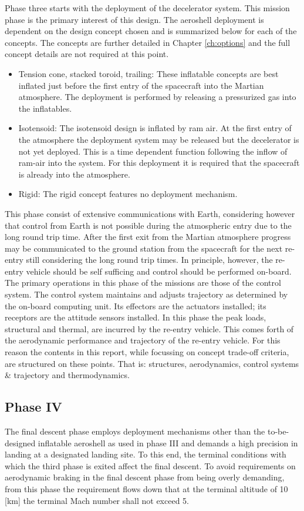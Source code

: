Phase three starts with the deployment of the decelerator system. This mission phase is the primary interest of this design. The aeroshell deployment is dependent on the design concept chosen and is summarized below for each of the concepts. The concepts are further detailed in Chapter \ref{ch:options} and the full concept details are not required at this point.

\begin{itemize}
\item Tension cone, stacked toroid, trailing: These inflatable concepts are best inflated just before the first entry of the spacecraft into the Martian atmosphere. The deployment is performed by releasing a pressurized gas into the inflatables.
\item Isotensoid: The isotensoid design is inflated by ram air. At the first entry of the atmosphere the deployment system may be released but the decelerator is not yet deployed. This is a time dependent function following the inflow of ram-air into the system. For this deployment it is required that the spacecraft is already into the atmosphere.
\item Rigid: The rigid concept features no deployment mechanism.
\end{itemize}
This phase consist of extensive communications with Earth, considering however that control from Earth is not possible during the atmospheric entry due to the long round trip time. After the first exit from the Martian atmosphere progress may be communicated to the ground station from the spacecraft for the next re-entry still considering the long round trip times. In principle, however, the re-entry vehicle should be self sufficing and control should be performed on-board. The primary operations in this phase of the missions are those of the control system. The control system maintains and adjusts trajectory as determined by the on-board computing unit. Its effectors are the actuators installed; its receptors are the attitude sensors installed. In this phase the peak loads, structural and thermal, are incurred by the re-entry vehicle.
This comes forth of the aerodynamic performance and trajectory of the re-entry vehicle. For this reason the contents in this report, while focussing on concept trade-off criteria, are structured on these points. That is: structures, aerodynamics, control systems \& trajectory and thermodynamics.



\subsection{Phase IV}\label{sec:p4}
The final descent phase employs deployment mechanisms other than the to-be-designed inflatable aeroshell as used in phase III and demands a high precision in landing at a designated landing site. To this end, the terminal conditions with which the third phase is exited affect the final descent. To avoid requirements on aerodynamic braking in the final descent phase from being overly demanding, from this phase the requirement flows down that at the terminal altitude of 10 [km] the terminal Mach number shall not exceed 5. 

